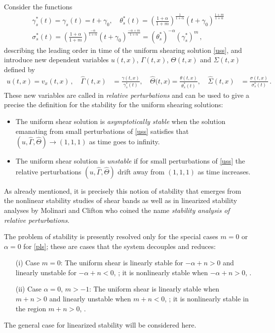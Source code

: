 \documentclass[a4paper,11pt]{article}
\theoremstyle{remark}
\begin{document}
Consider the  functions
\begin{equation}
\label{timescale}
\begin{aligned}
\gamma^*_s (t)  = \gamma_s (t)  = t + \gamma_0 , \quad 
\theta^*_s (t)  =\left( \frac{1+\alpha}{1+m}\right)^{\frac{1}{1+\alpha}} (t + \gamma_0)^{\frac{1+m}{1+\alpha}}
\\
\sigma^*_s (t) = \left( \frac{1+\alpha}{1+m}\right)^{\frac{-\alpha}{1+\alpha}} (t + \gamma_0)^{\frac{-\alpha+m}{1+\alpha}} 
= (\theta^*_s)^{-\alpha} (\gamma^*_s)^m \, ,
\end{aligned}
\end{equation}
describing the leading order in time of the uniform shearing solution \eqref{uss}, and introduce new dependent variables $u(t,x)$,
 $\Gamma (t, x)$, $\Theta (t,x)$ and $\Sigma(t,x)$ defined by 
\begin{equation}
\label{rescale}
 \begin{aligned}
 u(t,x) = v_x (t,x) \, , \quad
  \hat \Gamma (t,x) &= \frac{\gamma(t,x)}{\gamma^*_s(t)}, \quad \hat\Theta\big(t,x\big)=\frac{\theta(t,x)}{\theta^*_s (t)}, \quad 
  \hat\Sigma(t,x) &= \frac{\sigma(t,x)}{\sigma^*_s(t)} \, . \
   \end{aligned}
\end{equation}
These new variables are called in \cite{HN77,MC87,FM87}  {\it relative perturbations} and can be used to give a 
precise the definition for the stability for the uniform shearing solutions:
\begin{itemize}
\item
The uniform shear solution is {\it asymptotically stable} when the solution emanating from small perturbations
of \eqref{uss} satisfies that $(u, \hat\Gamma, \hat\Theta) \to (1,1,1)$ as time goes to infinity.
\item
The uniform shear solution is {\it unstable} if for small perturbations of \eqref{uss} the relative perturbations 
$(u, \hat\Gamma, \hat\Theta)$ drift away from $(1,1,1)$ as time increases.
\end{itemize}
As already mentioned, it is precisely this notion of stability that emerges from the nonlinear stability studies of shear bands \cite{DH83,Tzavaras86a} as well as
in linearized stability analyses by  Molinari and Clifton \cite{MC87,FM87} 
who coined the name {\it stability analysis of relative perturbations}. 

The problem of stability is presently resolved only for the special cases 
$m=0$ or $\alpha = 0$ for \eqref{pls};  these are cases that the system decouples and reduces:%
\begin{itemize}
\item[(i)] Case $m=0$: The uniform shear is linearly stable for $-\alpha + n > 0$ and linearly unstable for $-\alpha + n < 0$, \cite{FM87};
it is nonlinearly stable when $-\alpha + n > 0$, \cite{Tzavaras86a}.
\item[(ii)] Case $\alpha =0$, $m > -1$: The uniform shear is linearly stable when $m + n > 0$ and linearly unstable when $m+ n < 0$, \cite{FM87,Tzavaras92};
it is nonlinearly stable in the region $m + n > 0$, \cite{Tzavaras91}.
\end{itemize}
The general case for linearized stability will be considered here.
\end{document}
